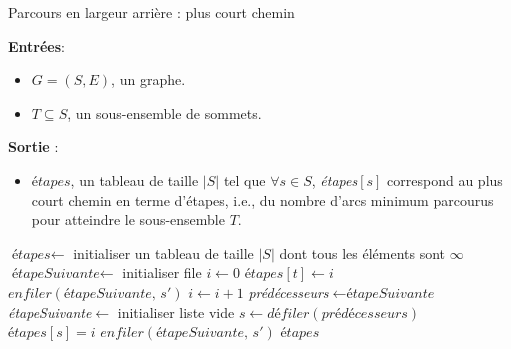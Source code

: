 \documentclass[12pt,a4paper]{report}
\theoremstyle{definition}%
\theoremstyle{remark}
\let\labelitemi\labelitemii
\begin{document}
\begin{algorithm}[H]
\caption{Parcours en largeur arrière : plus court chemin}
\hspace*{\algorithmicindent} \textbf{Entrées}:
	\begin{itemize}
		\renewcommand{\labelitemi}{\tiny$\bullet$}
		\item $G=(S, E)$, un graphe.
		\item $T \subseteq S$, un sous-ensemble de sommets.
	\end{itemize}
\hspace*{\algorithmicindent} \textbf{Sortie} :
\begin{itemize}
	\renewcommand{\labelitemi}{\tiny$\bullet$}
	\item $\textit{étapes}$, un tableau de taille $|S|$ tel que $\forall s \in
	S$, \textit{étapes}$[s]$ correspond au plus court chemin en terme d'étapes,
	i.e., du nombre d'arcs minimum parcourus pour atteindre le sous-ensemble
	$T$.
\end{itemize}
\begin{algorithmic}[1]
\STATE $\textit{étapes} \gets$ initialiser un tableau de taille $|S|$ dont
tous les éléments sont $\infty$
\STATE $\textit{étapeSuivante} \gets $ initialiser file
\STATE $i \gets 0$
	\STATE $\textit{étapes}[t] \gets i$
		\STATE $enfiler(\textit{étapeSuivante},\, s')$
	\ENDFOR
\ENDFOR
{}
	\STATE $i \gets i + 1$
	\STATE \textit{prédécesseurs}$\gets \textit{étapeSuivante}$
	\STATE \textit{étapeSuivante}$\gets$ initialiser liste vide
		\STATE $s \gets \textit{défiler}(\textit{prédécesseurs})$
			\STATE $\textit{étapes}[s] = i$
				\STATE $enfiler(\textit{étapeSuivante},\, s')$
			\ENDFOR
		\ENDIF
	\ENDWHILE
\ENDWHILE
\RETURN$\textit{étapes}$
\end{algorithmic}
\end{algorithm}
\end{document}
